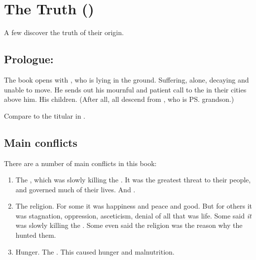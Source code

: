 \section{The Truth ()}
A few \resphain{} discover the truth of their origin.









\subsection[Prologue: Semiza]{Prologue: \Semiza}
The book opens with \Semiza, who is lying in the ground. 
Suffering, alone, decaying and unable to move. 
He sends out his mournful and patient call to the \resphain{} in their cities above him. 
His children. 
(After all, all \resphain{} descend from \Thanatzil, who is \ps{\Semiza}{} grandson.)

Compare to the titular  in . 









\subsection{Main conflicts}
There are a number of main conflicts in this book: 

\begin{enumerate}
  \item 
    The , which was slowly killing the \resphain. 
    It was the greatest threat to their people, and governed much of their lives. 
    And . 
  \item 
    The \Merkyran{} religion.
    For some it was happiness and peace and good. 
    But for others it was stagnation, oppression, asceticism, denial of all that was life. 
    Some said \emph{it} was slowly killing the \resphain.
    Some even said the religion was the reason why the \umbrae{} hunted them. 
  \item 
    Hunger. 
    The . 
    This caused hunger and malnutrition. 
\end{enumerate}





